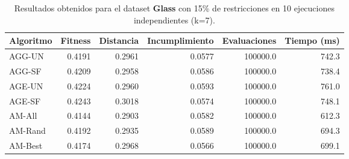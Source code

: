 \begin{table}[H]
    \centering
    \begin{tabular}{lrrrrr}
        \hline
        Algoritmo & Fitness & Distancia & Incumplimiento & Evaluaciones & Tiempo (ms)\\
        \hline
        AGG-UN & 0.4191 & 0.2961 & 0.0577 & 100000.0 & 742.3 \\
        AGG-SF & 0.4209 & 0.2958 & 0.0586 & 100000.0 & 738.4 \\
        AGE-UN & 0.4224 & 0.2960 & 0.0593 & 100000.0 & 761.0 \\
        AGE-SF & 0.4243 & 0.3018 & 0.0574 & 100000.0 & 748.1 \\
        AM-All & 0.4144 & 0.2903 & 0.0582 & 100000.0 & 612.3 \\
        AM-Rand & 0.4192 & 0.2935 & 0.0589 & 100000.0 & 694.3 \\
        AM-Best & 0.4174 & 0.2968 & 0.0566 & 100000.0 & 699.1 \\
        \hline
    \end{tabular}
    \caption{Resultados obtenidos para el dataset \textbf{Glass} con 15\% de restricciones en  10 ejecuciones independientes (k=7).}
    \label{tab:res_glass_15}
\end{table}